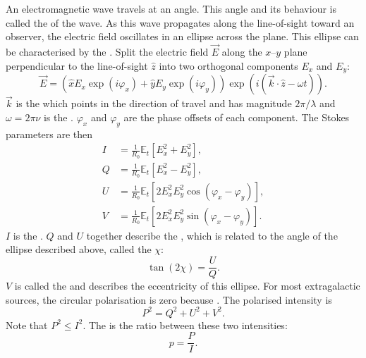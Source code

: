         An electromagnetic wave travels at an angle. This angle and its behaviour is called the  of the wave. As this wave propagates along the line-of-sight toward an observer, the electric field oscillates in an ellipse across the plane. This ellipse can be characterised by the . Split the electric field $\vec E$ along the $x$--$y$ plane perpendicular to the line-of-sight $\hat z$ into two orthogonal components $E_x$ and $E_y$:
        \begin{equation}
            \vec E = (\hat x E_x \exp(i \varphi_x) + \hat y E_y \exp(i \varphi_y)) \exp(i (\vec k \cdot \hat z - \omega t)).
        \end{equation}
        $\vec k$ is the  which points in the direction of travel and has magnitude $2\pi/\lambda$ and $\omega = 2\pi\nu$ is the . $\varphi_x$ and $\varphi_y$ are the phase offsets of each component. The Stokes parameters are then \citep{condon_essential_2016}
        \begin{align}
            \label{eq:stokes-i}
            I &= \frac{1}{R_0} \mathbb E_t[E_x^2 + E_y^2],\\
            \label{eq:stokes-q}
            Q &= \frac{1}{R_0} \mathbb E_t[E_x^2 - E_y^2],\\
            \label{eq:stokes-u}
            U &= \frac{1}{R_0} \mathbb E_t[2 E_x^2 E_y^2 \cos (\varphi_x - \varphi_y)],\\
            \label{eq:stokes-v}
            V &= \frac{1}{R_0} \mathbb E_t[2 E_x^2 E_y^2 \sin (\varphi_x - \varphi_y)].
        \end{align}
        $I$ is the . $Q$ and $U$ together describe the , which is related to the angle of the ellipse described above, called the  $\chi$:
        \begin{equation}
            \label{eq:polarisation-angle}
            \tan (2 \chi) = \frac{U}{Q}.
        \end{equation}
        $V$ is called the  and describes the eccentricity of this ellipse. For most extragalactic sources, the circular polarisation is zero \citeneeded because . The polarised intensity is
        \begin{equation}
            \label{eq:polarised-intensity}
            P^2 = Q^2 + U^2 + V^2.
        \end{equation}
        Note that $P^2 \leq I^2$. The  is the ratio between these two intensities:
        \begin{equation}
            p = \frac{P}{I}.
        \end{equation}

